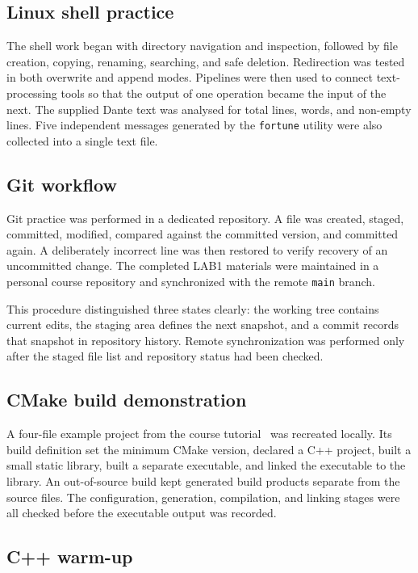 \documentclass[11pt,a4paper]{article}
\begin{document}
\subsection{Linux shell practice}

The shell work began with directory navigation and inspection, followed by file creation, copying, renaming, searching, and safe deletion. Redirection was tested in both overwrite and append modes. Pipelines were then used to connect text-processing tools so that the output of one operation became the input of the next. The supplied Dante text was analysed for total lines, words, and non-empty lines. Five independent messages generated by the \texttt{fortune} utility were also collected into a single text file.

\subsection{Git workflow}

Git practice was performed in a dedicated repository. A file was created, staged, committed, modified, compared against the committed version, and committed again. A deliberately incorrect line was then restored to verify recovery of an uncommitted change. The completed LAB1 materials were maintained in a personal course repository and synchronized with the remote \texttt{main} branch.

This procedure distinguished three states clearly: the working tree contains current edits, the staging area defines the next snapshot, and a commit records that snapshot in repository history. Remote synchronization was performed only after the staged file list and repository status had been checked.

\subsection{CMake build demonstration}

A four-file example project from the course tutorial~\cite{mitcmake} was recreated locally. Its build definition set the minimum CMake version, declared a C++ project, built a small static library, built a separate executable, and linked the executable to the library. An out-of-source build kept generated build products separate from the source files. The configuration, generation, compilation, and linking stages were all checked before the executable output was recorded.

\subsection{C++ warm-up}
\end{document}
